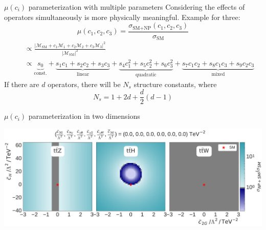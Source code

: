 \documentclass[professionalfont,fleqn]{beamer}
\begin{document}
\begin{frame}{$\mu(c_i)$ parameterization with multiple parameters}
  Considering the effects of operators simultaneously is more physically meaningful. Example for three:
  \footnotesize
  {\setlength{\mathindent}{-5mm}
    \begin{equation*}
      \mu(c_1, c_2, c_3) = \frac{\sigma_\text{SM+NP}(c_1, c_2, c_3)}{\sigma_\text{SM}}
    \end{equation*}
  \vspace{-5mm}
  \begin{align*}
  \quad &\propto \frac{\lvert\mathcal{M}_\text{SM} + c_1\mathcal{M}_1 + c_2\mathcal{M}_2 + c_3\mathcal{M}_3\rvert^2}{\lvert\mathcal{M}_\text{SM}\rvert^2} \\
    &\propto \underbrace{s_0}_{\text{const.}} + \underbrace{s_1 c_1 + s_2 c_2 +s_3 c_3}_{\text{linear}} + \underbrace{s_4 c_1^2 + s_5 c_2^2 + s_6 c_3^2}_{\text{quadratic}} + \underbrace{s_7 c_1 c_2 + s_8 c_1 c_3 + s_9 c_2 c_3}_{\text{mixed}}
  \end{align*}
  }
  If there are $d$ operators, there will be $N_s$ structure constants, where
  \begin{equation*}
    N_s = 1 + 2d + \frac{d}{2}(d - 1)
  \end{equation*}
\end{frame}

\begin{frame}{$\mu(c_i)$ parameterization in two dimensions}
  \begin{overlayarea}{\textwidth}{7cm}
    \includegraphics[width=\textwidth]{figures/thirteen-TeV/NP/c2G_cH} \\
  \end{overlayarea}
\end{frame}
\end{document}
